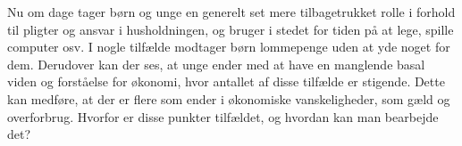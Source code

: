 Nu om dage tager børn og unge en generelt set mere tilbagetrukket rolle i forhold til pligter og ansvar i husholdningen, og bruger i stedet for tiden på at lege, spille computer osv\cite{Boerneliv}. I nogle tilfælde modtager børn lommepenge uden at yde noget for dem. Derudover kan der ses, at unge ender med at have en manglende basal viden og forståelse for økonomi, hvor antallet af disse tilfælde er stigende\cite{BusinessDK2}. Dette kan medføre, at der er flere som ender i økonomiske vanskeligheder, som gæld og overforbrug. Hvorfor er disse punkter tilfældet, og hvordan kan man bearbejde det?